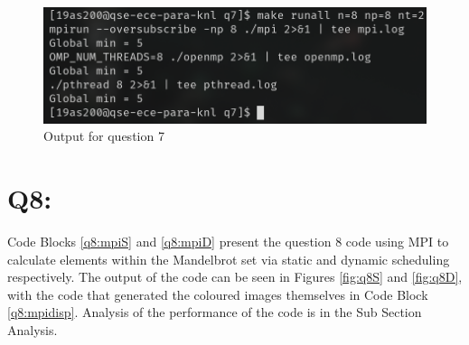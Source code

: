 \documentclass[11pt]{article}
\begin{document}
\begin{figure}[ht]
\centering
    \includegraphics[width=\textwidth]{./images/q7.png}
\caption{Output for question 7}
\label{fig:q7}
\end{figure}
% 

\section*{Q8:}

Code Blocks \ref{q8:mpiS} and \ref{q8:mpiD} present the question 8 code using MPI to calculate elements within the Mandelbrot set via static and dynamic scheduling respectively.
The output of the code can be seen in Figures \ref{fig:q8S} and \ref{fig:q8D}, with the code that generated the coloured images themselves in Code Block \ref{q8:mpidisp}.
Analysis of the performance of the code is in the Sub Section Analysis.



\end{document}
